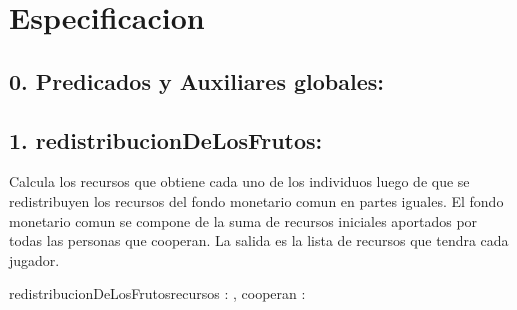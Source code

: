 \documentclass[10pt,a4paper]{article}
\begin{document}
\maketitle

\section{Especificacion}

\subsection*{0. Predicados y Auxiliares globales:}
	\hfill

		{
		}
	
	{}

\subsection*{1. redistribucionDeLosFrutos:}
	Calcula los recursos que obtiene cada uno de los individuos luego de que se redistribuyen
	los recursos del fondo monetario comun en partes iguales. El fondo monetario comun se compone de la suma de recursos
	iniciales aportados por todas las personas que cooperan. La salida es la lista de recursos que tendra cada jugador.

	\begin{proc}{redistribucionDeLosFrutos}{\In recursos : \TLista{\float}, \In cooperan : \TLista{\bool}}{\TLista{\float}}
		\hfill 

		{ 
		}

		\hfill 
		

		\hfill 


		

	\end{proc}
	
\end{document}
